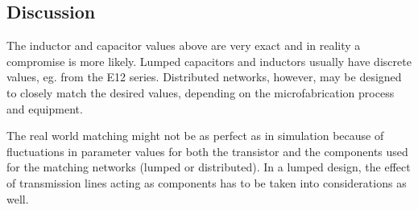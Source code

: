\documentclass[report.tex]{subfiles}
\begin{document}
\subsection{Discussion}

The inductor and capacitor values above are very exact and in reality a compromise is more likely. Lumped capacitors and inductors usually have discrete values, eg. from the E12 series. Distributed networks, however, may be designed to closely match the desired values, depending on the microfabrication process and equipment.

The real world matching might not be as perfect as in simulation because of fluctuations in parameter values for both the transistor and the components used for the matching networks (lumped or distributed). In a lumped design, the effect of transmission lines acting as components has to be taken into considerations as well.
\end{document}
